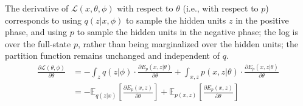 \documentclass{article} %
\begin{document}
The derivative of $\mathcal{L}(x, \theta, \phi)$ with respect to $\theta$ (i.e., with respect to $p$) corresponds to using $q(z|x,\phi)$ to sample the hidden units $z$ in the positive phase, and using $p$ to sample the hidden units in the negative phase; the log is over the full-state $p$, rather than being marginalized over the hidden units; the partition function remains unchanged and independent of $q$.  
\begin{align}
\frac{\partial \mathcal{L}(\theta, \phi)}{\partial \theta} &= -\int_z q(z|\phi) \cdot \frac{\partial E_p(x, z| \theta)}{\partial \theta} + \int_{x, z} p(x,z|\theta) \cdot \frac{\partial E_p(x, z | \theta)}{\partial \theta} \nonumber \\
&= -\mathbb{E}_{q(z|x)} \left[ \frac{\partial E_p(x,z)}{\partial \theta} \right] + \mathbb{E}_{p(x,z)} \left[ \frac{\partial E_p(x,z)}{\partial \theta} \right] \label{KL-gradient-p}
\end{align}
\end{document}
